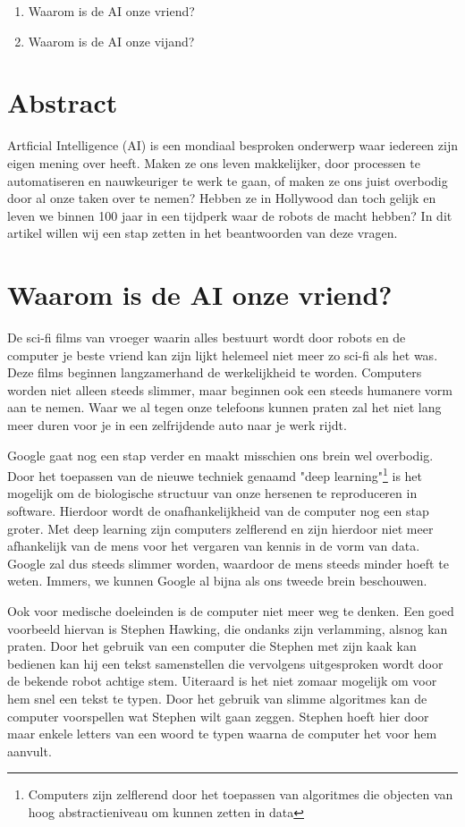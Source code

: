 \documentclass{article}
\begin{document}
\begin{enumerate}
	\item Waarom is de AI onze vriend?
	\item Waarom is de AI onze vijand?
\end{enumerate}  

\newpage
\section{Abstract}
	Artficial Intelligence (AI) is een mondiaal besproken onderwerp waar iedereen zijn eigen mening over heeft. 
	Maken ze ons leven makkelijker, door processen te automatiseren en nauwkeuriger te werk te gaan, of
	maken ze ons juist overbodig door al onze taken over te nemen? Hebben ze in Hollywood dan toch gelijk
	en leven we binnen 100 jaar in een tijdperk waar de robots de macht hebben? In dit artikel willen wij
	een stap zetten in het beantwoorden van deze vragen.

\section{Waarom is de AI onze vriend?}
De sci-fi films van vroeger waarin alles bestuurt wordt door robots en de computer je beste vriend kan zijn
lijkt helemeel niet meer zo sci-fi als het was. Deze films beginnen langzamerhand de werkelijkheid te worden. 
Computers worden niet alleen steeds slimmer, maar beginnen ook een steeds humanere vorm aan te nemen. Waar we 
al tegen onze telefoons kunnen praten zal het niet lang meer duren voor je in een zelfrijdende auto naar je werk rijdt. 

Google gaat nog een stap verder en maakt misschien ons brein wel overbodig. Door het toepassen van de nieuwe techniek genaamd
"deep learning"\footnote{Computers zijn zelflerend door het toepassen van algoritmes die objecten van hoog abstractieniveau
om kunnen zetten in data} is het mogelijk om de biologische structuur van onze hersenen te reproduceren in software.
Hierdoor wordt de onafhankelijkheid van de computer nog een stap groter. Met deep learning zijn computers
zelflerend en zijn hierdoor niet meer afhankelijk van de mens voor het vergaren van kennis in de vorm van data. Google zal
dus steeds slimmer worden, waardoor de mens steeds minder hoeft te weten. Immers, we kunnen Google al bijna als ons
tweede brein beschouwen.\cite{breinoverbodig}

Ook voor medische doeleinden is de computer niet meer weg te denken. Een goed voorbeeld hiervan is Stephen Hawking, die ondanks
zijn verlamming, alsnog kan praten. Door het gebruik van een computer die Stephen met zijn kaak kan bedienen kan hij een
tekst samenstellen die vervolgens uitgesproken wordt door de bekende robot achtige stem. Uiteraard is het niet zomaar mogelijk
om voor hem snel een tekst te typen. Door het gebruik van slimme algoritmes kan de computer voorspellen wat Stephen wilt gaan
zeggen. Stephen hoeft hier door maar enkele letters van een woord te typen waarna de computer het voor hem aanvult.\cite{stephenhawking}
\end{document}
